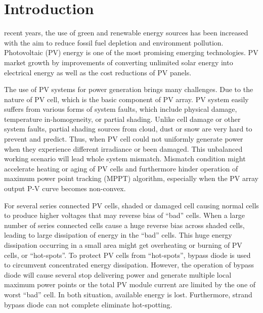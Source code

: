 \documentclass[journal]{IEEEtran}
\begin{document}
\IEEEpeerreviewmaketitle



\section{Introduction}\label{sec:introduction}
 recent years, the use of green and renewable energy sources has been increased with the aim to reduce fossil fuel depletion and environment pollution.
Photovoltaic (PV) energy is one of the most promising emerging technologies.
PV market growth by improvements of converting unlimited solar energy into electrical energy as well as the cost reductions of PV panels.

The use of PV systems for power generation brings many challenges.
Due to the nature of PV cell, which is the basic component of PV array.
PV system easily suffers from various forms of system faults, which include physical damage, temperature in-homogeneity, or partial shading.
Unlike cell damage or other system faults, partial shading sources from cloud, dust or snow are very hard to prevent and predict.
Thus, when PV cell could not uniformly generate power when they experience different irradiance or been damaged.
This unbalanced working scenario will lead whole system mismatch.
Mismatch condition might accelerate heating or aging of PV cells and furthermore hinder operation of maximum power point tracking (MPPT) algorithm, especially when the PV array output P-V curve becomes non-convex\cite{islam2018performance}.

For several series connected PV cells, shaded or damaged cell causing normal cells to produce higher voltages that may reverse bias of ``bad'' cells.
When a large number of series connected cells cause a huge reverse bias across shaded cells, leading to large dissipation of energy in the ``bad'' cells.
This huge energy dissipation occurring in a small area might get overheating or burning of PV cells, or ``hot-spots''.
To protect PV cells from ``hot-spots'', bypass diode is used to circumvent concentrated energy dissipation.
However, the operation of bypass diode will cause several stop delivering power and generate multiple local maximum power points or the total PV module current are limited by the one of worst ``bad'' cell.
In both situation, available energy is lost.
Furthermore, strand bypass diode can not complete eliminate hot-spotting\cite{kim2015reexamination}.
\end{document}
